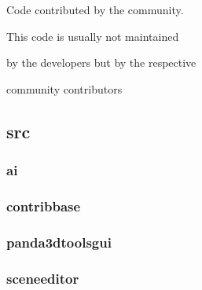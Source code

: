 \documentclass[a4paper]{article}
\begin{document}
{\centering\color{black}
Code contributed by the community.
\par}

{\centering\color{black}
This code is usually not maintained
\par}

{\centering\color{black}
by the developers but by the respective
\par}

{\centering\color{black}
community contributors
\par}

\clearpage\subsection[src]{src}
\hypertarget{RefHeading17391167907073}{}\subsubsection[ai]{ai}
\hypertarget{RefHeading17431167907073}{}\subsubsection{}
\clearpage\subsubsection[contribbase]{contribbase}
\hypertarget{RefHeading17451167907073}{}\subsubsection{}
\clearpage\subsubsection[panda3dtoolsgui]{panda3dtoolsgui}
\hypertarget{RefHeading17471167907073}{}\subsubsection{}
\clearpage\subsubsection[sceneeditor]{sceneeditor}
\hypertarget{RefHeading17491167907073}{}\subsubsection{}
\clearpage
\bigskip


\bigskip
\end{document}
